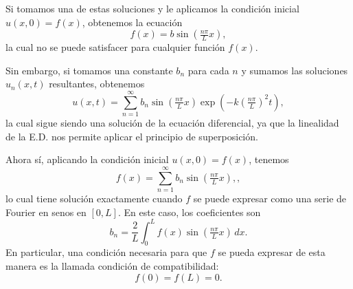 \documentclass[11pt,letterpaper]{report}
\newcommand\<{\langle}
\renewcommand\>{\rangle}
\begin{document}
Si tomamos una de estas soluciones y le aplicamos la condición
inicial $u(x,0)=f(x)$, obtenemos la ecuación
\[
  f(x) = b \sin(\tfrac{n\pi}{L}x)
,\]
la cual no se puede satisfacer para cualquier función $f(x)$.

Sin embargo, si tomamos una constante $b_n$ para cada $n$ y
sumamos las soluciones $u_n(x,t)$ resultantes, obtenemos
\begin{equation}
  u(x,t)
  = \sum_{n=1}^{\infty}
  b_n\sin(\tfrac{n\pi}{L}x)\exp(-k(\tfrac{n\pi}{L})^2t),
\end{equation}
la cual sigue siendo una solución de la ecuación diferencial, ya
que la linealidad de la E.D. nos permite aplicar
el principio de superposición.

Ahora sí, aplicando la condición inicial $u(x,0)=f(x)$, tenemos
\[
  f(x)
  = \sum_{n=1}^{\infty}
  b_n\sin(\tfrac{n\pi}{L}x),
,\]
lo cual tiene solución exactamente cuando $f$ se puede expresar
como una serie de Fourier en senos en $[0,L]$. En este caso, los
coeficientes son
\[
  b_n = \frac{2}{L}\int_0^L f(x)\sin(\tfrac{n\pi}{L}x)\,dx
.\]
En particular, una condición necesaria para que $f$ se pueda
expresar de esta manera es la llamada condición de
compatibilidad:
\[
  f(0)=f(L)=0
.\]
\end{document}
